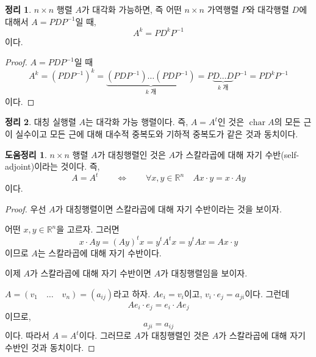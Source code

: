 \documentclass[unfonts,oneside,a4paper]{oblivoir}
\theoremstyle{definition}
\theoremstyle{theorem}
\newtheorem{theorem}{정리}[section]
\theoremstyle{theorem}
\newtheorem{lemma}{도움정리}[section]
\theoremstyle{remark}
\theoremstyle{remark}
\theoremstyle{remark}
\theoremstyle{remark}
\renewcommand{\vec}[1]{\bm{\mathit{#1}}}
\DeclareMathOperator{\Char}{char}
\begin{document}
\begin{theorem}
    $n \times n$ 행렬 $A$가 대각화 가능하면, 즉 어떤 $n \times n$ 가역행렬 $P$와 대각행렬 $D$에 대해서 $A = PDP^{-1}$일 때,
    \begin{equation*}
        A^k = PD^k P^{-1}
    \end{equation*}
    이다.
\end{theorem}

\begin{proof}
    $A = PDP^{-1}$일 때
    \begin{equation*}
        A^k = (PDP^{-1})^k = \underbrace{(PDP^{-1}) \dots (PDP^{-1})}_\text{$k$ 개} = P\underbrace{D\dots D}_\text{$k$ 개}P^{-1} = PD^kP^{-1}
    \end{equation*}
    이다.
\end{proof}

\begin{theorem}
    대칭 실행렬 $A$는 대각화 가능 행렬이다.
    즉, $A = A^t$인 것은 $\Char A$의 모든 근이 실수이고 모든 근에 대해 대수적 중복도와 기하적 중복도가 같은 것과 동치이다.
\end{theorem}

\begin{lemma} \label{lem:self_adjoint_sym}
    $n \times n$ 행렬 $A$가 대칭행렬인 것은 $A$가 스칼라곱에 대해 자기 수반(self-adjoint)이라는 것이다.
    즉,
    \begin{equation*}
        A = A^t \qquad \Longleftrightarrow \qquad \forall \vec x, \vec y \in \mathbb R^n \quad A\vec x \cdot \vec y = \vec x \cdot A \vec y
    \end{equation*}
    이다.
\end{lemma}

\begin{proof}
    우선 $A$가 대칭행렬이면 스칼라곱에 대해 자기 수반이라는 것을 보이자.

    어떤 $\vec x, \vec y \in \mathbb R^n$을 고르자.
    그러면
    \begin{equation*}
        \vec x \cdot A \vec y = (A\vec y)^t \vec x = \vec y^t A^t \vec x = \vec y^t A \vec x = A \vec x \cdot \vec y
    \end{equation*}
    이므로 $A$는 스칼라곱에 대해 자기 수반이다.

    이제 $A$가 스칼라곱에 대해 자기 수반이면 $A$가 대칭행렬임을 보이자.

    $A = (\vec v_1 \quad \dots \quad \vec v_n) = (a_{ij})$라고 하자.
    $A \vec e_i = \vec v_i$이고, $\vec v_i \cdot \vec e_j = a_{ji}$이다.
    그런데
    \begin{equation*}
        A \vec e_i \cdot e_j = e_i \cdot A \vec e_j
    \end{equation*}
    이므로,
    \begin{equation*}
        a_{ji} = a_{ij}
    \end{equation*}
    이다.
    따라서 $A = A^t$이다.
    그러므로 $A$가 대칭행렬인 것은 $A$가 스칼라곱에 대해 자기 수반인 것과 동치이다.
\end{proof}
\end{document}
